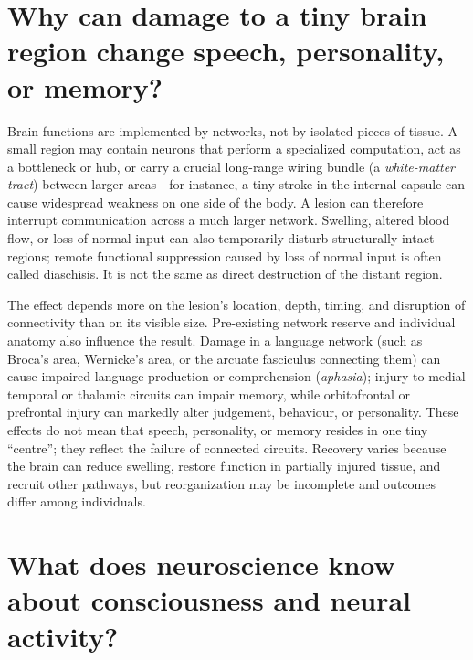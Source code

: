 \documentclass[11pt,oneside]{report}
\begin{document}
\section{Why can damage to a tiny brain region change speech, personality, or memory?}

Brain functions are implemented by networks, not by isolated pieces of tissue.
A small region may contain neurons that perform a specialized computation, act
as a bottleneck or hub, or carry a crucial long-range wiring bundle (a
\emph{white-matter tract}) between larger areas—for instance, a tiny stroke in
the internal capsule can cause widespread weakness on one side of the body.
A lesion can therefore interrupt communication across a much
larger network. Swelling, altered blood flow, or loss of normal input can also
temporarily disturb structurally intact regions; remote functional suppression
caused by loss of normal input is often called diaschisis. It is not the same as
direct destruction of the distant region.

The effect depends more on the lesion's location, depth, timing, and disruption
of connectivity than on its visible size. Pre-existing network reserve and
individual anatomy also influence the result. Damage in a language network (such
as Broca's area, Wernicke's area, or the arcuate fasciculus connecting them)
can cause impaired language production or comprehension (\emph{aphasia}); injury
to medial temporal or thalamic circuits can impair memory, while orbitofrontal
or prefrontal injury can markedly alter judgement, behaviour, or personality. These effects do not mean that speech,
personality, or memory resides in one tiny ``centre''; they reflect the failure
of connected circuits. Recovery varies because the brain can reduce swelling,
restore function in partially injured tissue, and recruit other pathways, but
reorganization may be incomplete and outcomes differ among individuals.

\section{What does neuroscience know about consciousness and neural activity?}
\end{document}
